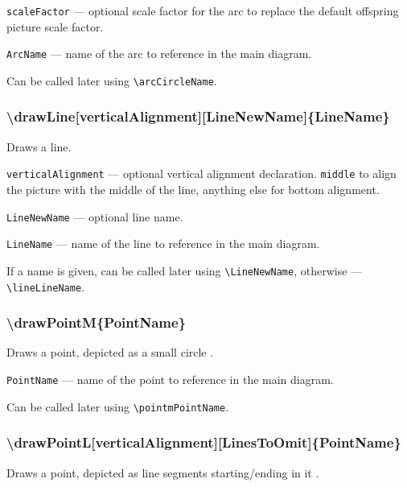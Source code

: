 \documentclass{ltxdoc}
\begin{document}
	\texttt{scaleFactor} — optional scale factor for the arc to replace the default offspring picture scale factor. 
	
	\texttt{ArcName} — name of the arc to reference in the main diagram. 
	
	Can be called later using \texttt{\textbackslash arcCircleName}.
	
\subsubsection{\textbackslash drawLine[verticalAlignment][LineNewName]\{LineName\}}

	Draws a line.

	\texttt{verticalAlignment} — optional vertical alignment declaration. \texttt{middle} to align the picture with the middle of the line, anything else for bottom alignment.
	
	\texttt{LineNewName} — optional line name. 
	
	\texttt{LineName} — name of the line to reference in the main diagram. 
	
	If a name is given, can be called later using \texttt{\textbackslash LineNewName}, otherwise — \texttt{\textbackslash lineLineName}. 
	
\subsubsection{\textbackslash drawPointM\{PointName\}}


	Draws a point, depicted as a small circle .
	
	\texttt{PointName} — name of the point to reference in the main diagram. 
	
	Can be called later using \texttt{\textbackslash pointmPointName}. 

\subsubsection{\textbackslash drawPointL[verticalAlignment][LinesToOmit]\{PointName\}}\label{drawPointL}

	Draws a point, depicted as line segments starting/ending in it .
\end{document}
